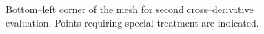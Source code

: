 \documentclass[dvips]{article}
\begin{document}
\begin{figure}[htbp]
\begin{center}
\caption{Bottom--left corner of the mesh for second cross--derivative
evaluation.  Points requiring special treatment are indicated.}
\end{center}
\label{FigBOTTOMLEFT}
\end{figure}
\end{document}
